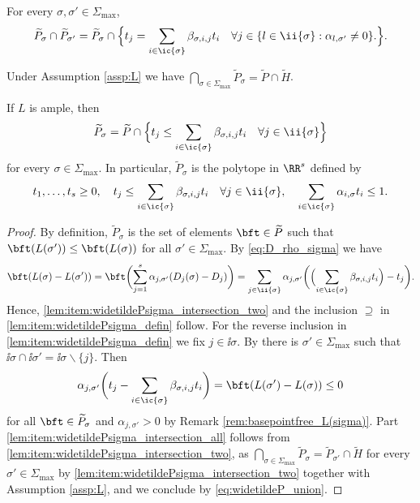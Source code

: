 \pagebreak[2]
\skpt
\begin{lemma}
\label{lem:widetildePsigma}
\begin{enumeratei}
\item
\label{lem:item:widetildePsigma_intersection_two}
For every $\sigma, \sigma'\in\Sigma_{\max}$,
\[
\widetilde P_\sigma \cap \widetilde P_{\sigma'} =
\widetilde P_\sigma \cap
\Bigl \{
t_{j}
= \sum_{i\in\ic{\sigma}} \beta_{\sigma, i, j}t_i
\quad \forall j\in \{l\in \ii{\sigma} : \alpha_{l, \sigma'}\neq0\}.
\Bigr \}.
\]
\item
\label{lem:item:widetildePsigma_intersection_all}
Under Assumption \ref{assp:L} we have
$\bigcap_{\sigma\in\Sigma_{\max}} \widetilde P_{\sigma} =\widetilde P \cap \widetilde H$.
\item
\label{lem:item:widetildePsigma_defin}
If $L$ is ample, then
\[
\widetilde P_\sigma
= \widetilde P \cap
\Bigl \{
t_{j}
\leq \sum_{i\in\ic{\sigma}} \beta_{\sigma, i, j}t_i
\quad \forall j\in\ii{\sigma}
\Bigr \}
\]
for every $\sigma\in\Sigma_{\max}$.
In particular, $\widetilde P_\sigma$
is the polytope in $\RR^{s}$ defined by
\[
t_1,\dots,t_s \geq0, \quad
t_{j}
\leq \sum_{i\in\ic{\sigma}} \beta_{\sigma, i,j}t_i
\quad \forall j\in\ii{\sigma}, \quad
\sum_{i\in\ic{\sigma}} \alpha_{i,\sigma}t_i \leq 1.
\]
\end{enumeratei}
\end{lemma}
\begin{proof}
By definition, $\widetilde P_{\sigma}$ is the set of elements $\bft\in \widetilde P$
such that $\bft(L(\sigma'))\leq \bft(L(\sigma))$
for all $\sigma'\in\Sigma_{\max}$. By \eqref{eq:D_rho_sigma} we have
\begin{equation*}
\bft (L(\sigma) - L(\sigma'))
= \bft \biggl(\sum_{j=1}^s \alpha_{j,\sigma'} (D_j(\sigma) - D_j) \biggr)
= \sum_{j\in \ii{\sigma}} \alpha_{j,\sigma'}
\biggl (\Bigl(
\sum_{i\in\ic{\sigma}}\beta_{\sigma,i,j} t_i
\Bigr) - {t_j} \biggr).
\end{equation*}
Hence, \eqref{lem:item:widetildePsigma_intersection_two} and
the inclusion $\supseteq$ in \eqref{lem:item:widetildePsigma_defin} follow.
For the reverse inclusion in \eqref{lem:item:widetildePsigma_defin} we fix $j\in\ii{\sigma}$.
By \cite[Lem.\,8.9]{MR1679841}
there is
$\sigma'\in\Sigma_{\max}$ such that
$\ii{\sigma}\cap\ii{\sigma'}=\ii{\sigma}\smallsetminus\{j\}$.
Then
\[
\alpha_{j,\sigma'}
\biggl(
{t_j}
-\sum_{i\in\ic{\sigma}}\beta_{\sigma,i,j} t_i
\biggr) = \bft (L(\sigma') - L(\sigma)) \leq 0
\]
for all $\bft\in\widetilde P_\sigma$ and $\alpha_{j,\sigma'}>0$
by Remark \ref{rem:basepointfree_L(sigma)}.
Part \eqref{lem:item:widetildePsigma_intersection_all} follows
from \eqref{lem:item:widetildePsigma_intersection_two},
as $\bigcap_{\sigma\in\Sigma_{\max}} \widetilde P_{\sigma} =\widetilde P_{\sigma'} \cap \widetilde H$
for every $\sigma'\in\Sigma_{\max}$ by \eqref{lem:item:widetildePsigma_intersection_two}
together with Assumption \ref{assp:L}, and we conclude by \eqref{eq:widetildeP_union}.
\end{proof}

